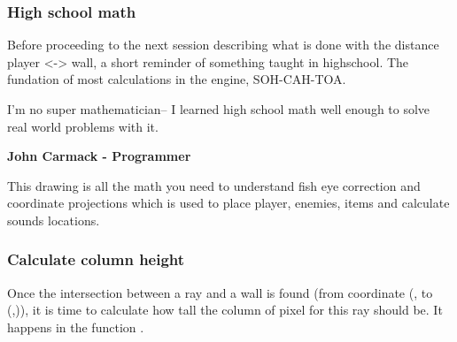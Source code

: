 \subsubsection{High school math}
Before proceeding to the next session describing what is done with the distance player <-> wall, a short reminder of something taught in highschool. The fundation of most calculations in the engine, SOH-CAH-TOA.\\
\par
 \begin{fancyquotes}
  I'm no super mathematician-- I learned high school math well enough to solve real world problems with it.\\
 \par
\textbf{John Carmack - Programmer}
 \end{fancyquotes}


\par
\begin{figure}[H]
\centering
 
\end{figure}



This drawing is all the math you need to understand fish eye correction and coordinate projections which is used to place player, enemies, items and calculate sounds locations.\\






\subsubsection{Calculate column height}
Once the intersection between a ray and a wall is found (from coordinate (, to (,)), it is time to calculate how tall the column of pixel for this ray should be. It happens in the function .\\

\begin{minipage}{\textwidth}

\end{minipage}

